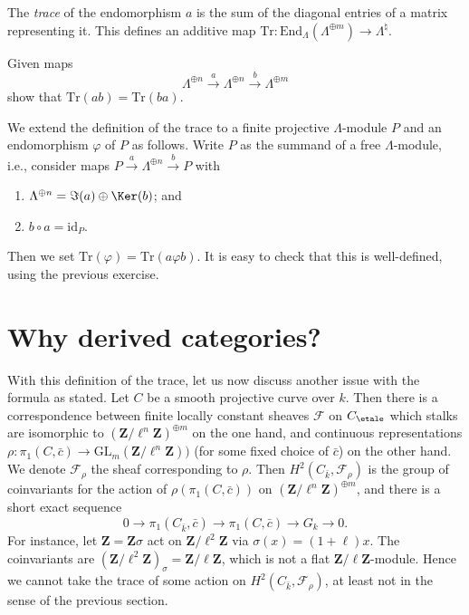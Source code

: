 \begin{definition}
\label{definition-trace}
The {\it trace} of the endomorphism $a$ is the sum of the diagonal entries of
a matrix representing it. This defines an additive map $\text{Tr} :
\text{End}_\Lambda(\Lambda^{\oplus m}) \to \Lambda^\natural$.
\end{definition}

\begin{exercise}
\label{exercise-trace-is-trace}
Given maps
$$
\Lambda^{\oplus n} \xrightarrow{a}
\Lambda^{\oplus n} \xrightarrow{b}
\Lambda^{\oplus m}
$$
show that $\text{Tr}(ab) = \text{Tr}(ba)$.
\end{exercise}

\noindent
We extend the definition of the trace to a finite projective $\Lambda$-module
$P$ and an endomorphism $\varphi$ of $P$ as follows. Write $P$ as the summand
of a free $\Lambda$-module, i.e., consider maps $P \xrightarrow{a}
\Lambda^{\oplus n} \xrightarrow{b} P$ with
\begin{enumerate}
\item
$\Lambda^{\oplus n} = \Im(a) \oplus \Ker(b)$; and
\item
$b\circ a = \text{id}_P$.
\end{enumerate}
Then we set $\text{Tr}(\varphi) = \text{Tr}(a\varphi b)$. It is easy to check
that this is well-defined, using the previous exercise.








\section{Why derived categories?}
\label{section-derived-categories-why}

\noindent
With this definition of the trace, let us now discuss another issue with the
formula as stated. Let $C$ be a smooth projective curve over $k$. Then there is
a correspondence between finite locally constant sheaves $\mathcal{F}$ on
$C_\etale$ which stalks are isomorphic to
${(\mathbf{Z}/\ell^n\mathbf{Z})}^{\oplus m}$ on the one hand, and continuous
representations $\rho : \pi_1 (C, \bar c) \to
\text{GL}_m(\mathbf{Z}/\ell^n\mathbf{Z}))$ (for some fixed choice of $\bar c$)
on the other hand. We denote $\mathcal{F}_\rho$ the sheaf corresponding to
$\rho$. Then $H^2 (C_{\bar k}, \mathcal{F}_\rho)$ is the group of coinvariants
for the action of $\rho(\pi_1 (C, \bar c))$ on
${(\mathbf{Z}/\ell^n\mathbf{Z})}^{\oplus m}$, and there is a short exact
sequence
$$
0 \longrightarrow \pi_1 (C_{\bar k}, \bar c) \longrightarrow \pi_1 (C, \bar c)
\longrightarrow G_k \longrightarrow 0.
$$
For instance, let $\mathbf{Z} = \mathbf{Z} \sigma$ act on
$\mathbf{Z}/\ell^2\mathbf{Z}$ via $\sigma(x) = (1+\ell) x$. The coinvariants
are $(\mathbf{Z}/\ell^2\mathbf{Z})_{\sigma} = \mathbf{Z}/\ell\mathbf{Z}$, which
is not a flat $\mathbf{Z}/\ell\mathbf{Z}$-module. Hence we cannot take the
trace of some action on $H^2(C_{\bar k}, \mathcal{F}_\rho)$, at least not in
the sense of the previous section.


